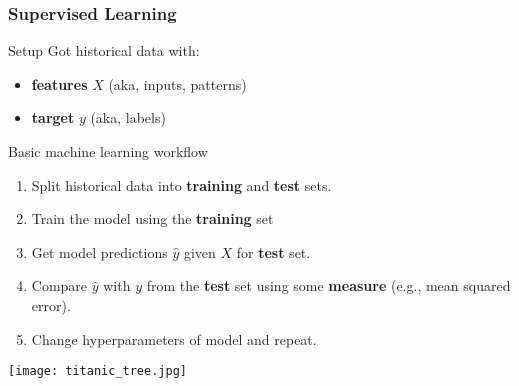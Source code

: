 \documentclass[t]{beamer}
\newcommand\df{\bf\color{Maroon}}
\begin{document}
 \begin{frame}
   \frametitle{Supervised Learning}
   \begin{block}{Setup}
     Got historical data with:
     \begin{itemize}
     \item {\df features}  $X$ (aka, inputs, patterns)
     \item {\df target} $y$ (aka, labels)\pause
     \end{itemize}
   \end{block}
   \begin{block}{Basic machine learning workflow}
     \begin{enumerate}
     \item Split historical data into {\df training} and {\df test} sets.\pause
     \item Train the model using the {\df training} set\pause
     \item Get model predictions $\hat y$ given $X$ for {\df test} set.\pause
     \item Compare $\hat y$ with $y$ from the {\df test} set using some {\df measure} (e.g.,
       mean squared error).\pause
     \item Change hyperparameters of model and repeat.
     \end{enumerate}
   \end{block}
 \end{frame}

\begin{frame}[plain]
  \begin{center}
     \texttt{[image: titanic\_tree.jpg]}
   \end{center}
\end{frame}
\end{document}
